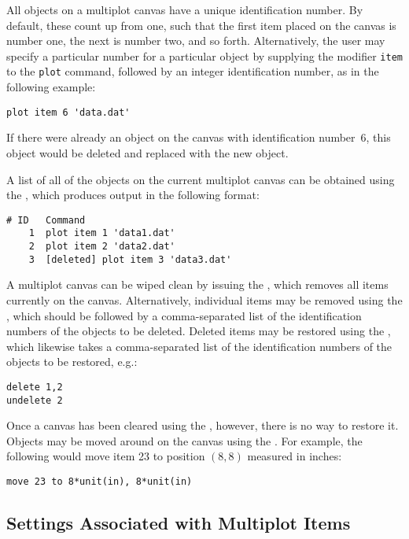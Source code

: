 All objects on a multiplot canvas have a unique identification number.  By
default, these count up from one, such that the first item placed on the canvas
is number one, the next is number two, and so forth. Alternatively, the user
may specify a particular number for a particular object by supplying the
modifier {\tt item} to the {\tt plot} command, followed by an integer
identification number, as in the following example:
\begin{verbatim}
plot item 6 'data.dat'
\end{verbatim}
If there were already an object on the canvas with identification number~6,
this object would be deleted and replaced with the new object.

A list of all of the objects on the current multiplot canvas can be obtained
using the , which produces output in the following format:
\begin{verbatim}
# ID   Command
    1  plot item 1 'data1.dat'
    2  plot item 2 'data2.dat'
    3  [deleted] plot item 3 'data3.dat'
\end{verbatim}

A multiplot canvas can be wiped clean by issuing the , which
removes all items currently on the canvas. Alternatively, individual items may
be removed using the , which should be followed by a
comma-separated list of the identification numbers of the objects to be
deleted.  Deleted items may be restored using the , which
likewise takes a comma-separated list of the identification numbers of the
objects to be restored, e.g.:
\begin{verbatim}
delete 1,2
undelete 2
\end{verbatim}
Once a canvas has been cleared using the , however, there is no
way to restore it.  Objects may be moved around on the canvas using the
. For example, the following would move item 23 to position
$(8,8)$ measured in inches:
\begin{verbatim}
move 23 to 8*unit(in), 8*unit(in)
\end{verbatim}

\subsection{Settings Associated with Multiplot Items}

